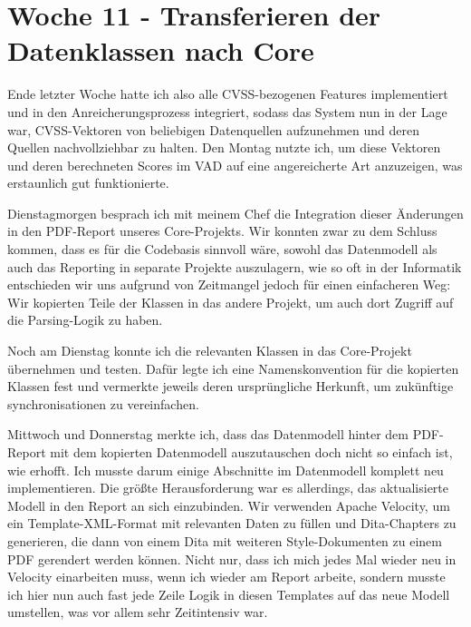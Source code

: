 \section{Woche 11 - Transferieren der Datenklassen nach Core} \label{sec:bericht-wo-11-initial}


\lweekdaymarginpar{\weekdayMondayLong}

Ende letzter Woche hatte ich also alle CVSS-bezogenen Features implementiert und in den Anreicherungsprozess integriert, sodass das System nun in der Lage war, CVSS-Vektoren von beliebigen Datenquellen aufzunehmen und deren Quellen nachvollziehbar zu halten.
Den Montag nutzte ich, um diese Vektoren und deren berechneten Scores im VAD auf eine angereicherte Art anzuzeigen, was erstaunlich gut funktionierte.

\sweekdaymarginpar{\weekdayTuesdayLong}

Dienstagmorgen besprach ich mit meinem Chef die Integration dieser Änderungen in den PDF-Report unseres Core-Projekts.
Wir konnten zwar zu dem Schluss kommen, dass es für die Codebasis sinnvoll wäre, sowohl das Datenmodell als auch das Reporting in separate Projekte auszulagern, wie so oft in der Informatik entschieden wir uns aufgrund von Zeitmangel jedoch für einen einfacheren Weg:
Wir kopierten Teile der Klassen in das andere Projekt, um auch dort Zugriff auf die Parsing-Logik zu haben.

Noch am Dienstag konnte ich die relevanten Klassen in das Core-Projekt übernehmen und testen.
Dafür legte ich eine Namenskonvention für die kopierten Klassen fest und vermerkte jeweils deren ursprüngliche Herkunft, um zukünftige synchronisationen zu vereinfachen.

\sweekdaymarginpar{\weekdayWednesdayShort, \weekdayThursdayShort}

Mittwoch und Donnerstag merkte ich, dass das Datenmodell hinter dem PDF-Report mit dem kopierten Datenmodell auszutauschen doch nicht so einfach ist, wie erhofft.
Ich musste darum einige Abschnitte im Datenmodell komplett neu implementieren.
Die größte Herausforderung war es allerdings, das aktualisierte Modell in den Report an sich einzubinden.
Wir verwenden Apache Velocity, um ein Template-XML-Format mit relevanten Daten zu füllen und Dita-Chapters zu generieren, die dann von einem Dita mit weiteren Style-Dokumenten zu einem PDF gerendert werden können.
Nicht nur, dass ich mich jedes Mal wieder neu in Velocity einarbeiten muss, wenn ich wieder am Report arbeite, sondern musste ich hier nun auch fast jede Zeile Logik in diesen Templates auf das neue Modell umstellen, was vor allem sehr Zeitintensiv war.

